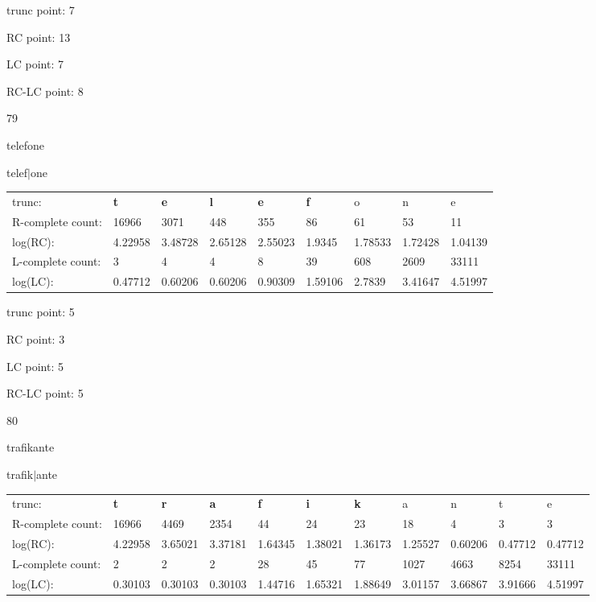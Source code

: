 \documentclass{article}
\begin{document}
trunc point: 7

RC point: 13

LC point: 7

RC-LC point: 8

\vspace{3em}



79

telefone

telef$|$one

\vspace{1em}

\begin{tabular}{l|llllllll}

trunc: & {\color{red}\bf t} & {\color{red}\bf e} & {\color{red}\bf l} & {\color{red}\bf e} & {\color{red}\bf f} & o & n & e \\ 
R-complete count: & 16966 & 3071 & 448 & 355 & 86 & 61 & 53 & 11 \\ 
log(RC): & 4.22958 & 3.48728 & 2.65128 & 2.55023 & 1.9345 & 1.78533 & 1.72428 & 1.04139 \\ 
L-complete count: & 3 & 4 & 4 & 8 & 39 & 608 & 2609 & 33111 \\ 
log(LC): & 0.47712 & 0.60206 & 0.60206 & 0.90309 & 1.59106 & 2.7839 & 3.41647 & 4.51997 \\ 
\end{tabular}

trunc point: 5

RC point: 3

LC point: 5

RC-LC point: 5

\vspace{3em}



80

trafikante

trafik$|$ante

\vspace{1em}

\begin{tabular}{l|llllllllll}

trunc: & {\color{red}\bf t} & {\color{red}\bf r} & {\color{red}\bf a} & {\color{red}\bf f} & {\color{red}\bf i} & {\color{red}\bf k} & a & n & t & e \\ 
R-complete count: & 16966 & 4469 & 2354 & 44 & 24 & 23 & 18 & 4 & 3 & 3 \\ 
log(RC): & 4.22958 & 3.65021 & 3.37181 & 1.64345 & 1.38021 & 1.36173 & 1.25527 & 0.60206 & 0.47712 & 0.47712 \\ 
L-complete count: & 2 & 2 & 2 & 28 & 45 & 77 & 1027 & 4663 & 8254 & 33111 \\ 
log(LC): & 0.30103 & 0.30103 & 0.30103 & 1.44716 & 1.65321 & 1.88649 & 3.01157 & 3.66867 & 3.91666 & 4.51997 \\ 
\end{tabular}
\end{document}
